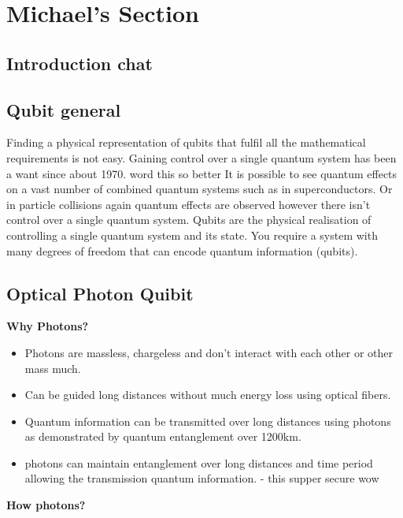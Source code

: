 \section{Michael's Section}
\subsection{Introduction chat}

\subsection{Qubit general}
Finding a physical representation of qubits that fulfil all the mathematical requirements is not easy.
Gaining control over a single quantum system has been a want since about 1970. word this so better
It is possible to see quantum effects on a vast number of combined quantum systems such as in superconductors. \cite{nielsen_quantum_2010}
Or in particle collisions again quantum effects are observed however there isn't control over a single quantum system.
Qubits are the physical realisation of controlling a single quantum system and its state.
You require a system with many degrees of freedom that can encode quantum information (qubits). \cite{bergou_quantum_2021}

\subsection{Optical Photon Quibit}

{\bf Why Photons?}
\begin{itemize}
    \item Photons are massless, chargeless and don't interact with each other or other mass much. \cite{nielsen_quantum_2010}
    \item Can be guided long distances without much energy loss using optical fibers. \cite{nielsen_quantum_2010}
    \item Quantum information can be transmitted over long distances using photons as demonstrated by quantum entanglement over 1200km. \cite{yin_satellite-based_2017}
    \item photons can maintain entanglement over long distances and time period allowing the transmission quantum information. - this supper secure wow \cite{thibault_team_nodate}
\end{itemize}

\vspace{1em}
{\bf How photons?}

